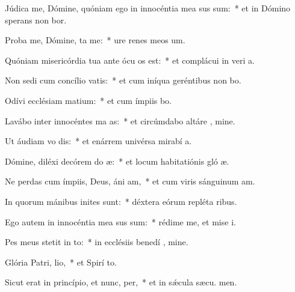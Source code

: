 \item Júdica me, Dómine, quóniam ego in innocéntia mea sus sum:~* et in Dómino sperans non bor.
\item Proba me, Dómine,  ta me:~* ure renes meos   um.
\item Quóniam misericórdia tua ante ócu os est:~* et complácui in veri a.
\item Non sedi cum concílio vatis:~* et cum iníqua geréntibus non bo.
\item Odívi ecclésiam matium:~* et cum ímpiis  bo.
\item Lavábo inter innocéntes ma as:~* et circúmdabo altáre , mine.
\item Ut áudiam vo dis:~* et enárrem univérsa mirabí a.
\item Dómine, diléxi decórem do æ:~* et locum habitatiónis gló æ.
\item Ne perdas cum ímpiis, Deus, áni am,~* et cum viris sánguinum  am.
\item In quorum mánibus inites sunt:~* déxtera eórum repléta  ribus.
\item Ego autem in innocéntia mea sus sum:~* rédime me, et mise i.
\item Pes meus stetit in to:~* in ecclésiis benedí , mine.
\item Glória Patri,  lio,~* et Spirí to.
\item Sicut erat in princípio, et nunc,  per,~* et in sǽcula sæcu. men.
